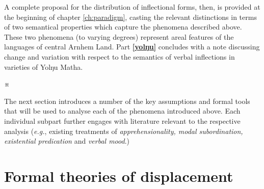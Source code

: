 \documentclass[11pt,dvipsnames]{report}
\newcommand{\fancybreak}{\begin{center}
		\huge\sf	 ※ %
\end{center}

\noindent}
\begin{document}
A complete proposal for the distribution of inflectional forms, then, is provided at the beginning of chapter \ref{ch:paradigm}, casting the relevant distinctions in terms of two semantical properties which capture the phenomena described above. These two phenomena (to varying degrees) represent areal features of the languages of central Arnhem Land. Part \textbf{\ref{yolŋu}} concludes with a note discussing change and variation with respect to the semantics of verbal inflections in varieties of Yolŋu Matha.
\fancybreak
The next section introduces a number of the key assumptions and formal tools that will be used to analyse each of the phenomena introduced above. Each individual subpart further engages with literature relevant to the respective analysis (\textit{e.g.}, existing treatments of \textit{apprehensionality, modal subordination, existential predication} and \textit{verbal mood}.)


%			
\section{Formal theories of displacement}\label{LitRev}
\end{document}
